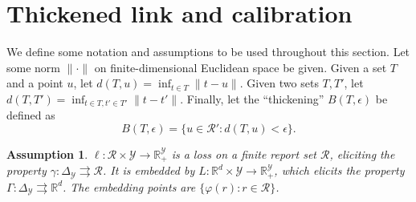 \documentclass[12pt]{article}
\newcommand{\Comments}{1}
\newcommand{\mynote}[2]{\ifnum\Comments=1\textcolor{#1}{#2}\fi}
\newcommand{\raf}[1]{\mynote{green}{[RF: #1]}}
\newcommand{\reals}{\mathbb{R}}
\newcommand{\prop}[1]{\mathrm{prop}[#1]}
\newcommand{\simplex}{\Delta_\Y}
\newcommand{\R}{\mathcal{R}}
\newcommand{\U}{\mathcal{U}}
\newcommand{\Y}{\mathcal{Y}}
\newcommand{\toto}{\rightrightarrows}
\newcommand{\trim}{\mathrm{trim}}
\newtheorem{assumption}{Assumption}
\begin{document}
%

\section{Thickened link and calibration} \label{app:calibration}

We define some notation and assumptions to be used throughout this section.
Let some norm $\|\cdot\|$ on finite-dimensional Euclidean space be given.
Given a set $T$ and a point $u$, let $d(T,u) = \inf_{t \in T} \|t-u\|$.
Given two sets $T,T'$, let $d(T,T') = \inf_{t\in T, t' \in T'} \|t-t'\|$.
Finally, let the ``thickening'' $B(T,\epsilon)$ be defined as
  \[ B(T,\epsilon) = \{u \in \R' : d(T,u) < \epsilon \} . \]

\begin{assumption} \label{assume:cal}
  $\ell: \R \times \Y \to \reals^{\Y}_+$ is a loss on a finite report set $\R$, eliciting the property $\gamma: \simplex \toto \R$.
  It is embedded by $L: \reals^d \times \Y \to \reals^{\Y}_+$, which elicits the property $\Gamma: \simplex \toto \reals^d$.
  The embedding points are $\{\varphi(r) : r \in \R\}$.
\end{assumption}
\end{document}
